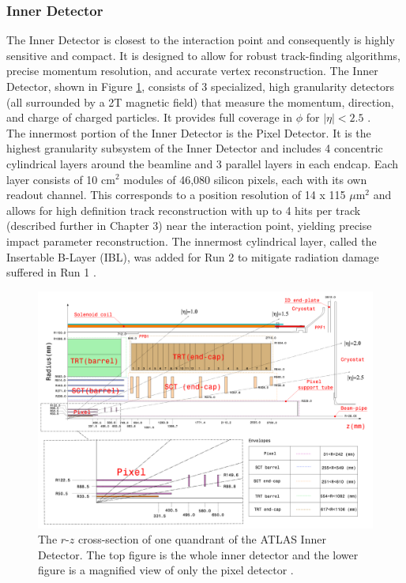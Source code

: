 \subsubsection{Inner Detector}
The Inner Detector is closest to the interaction point and consequently is highly sensitive and compact. It is designed to allow for robust track-finding algorithms, precise momentum resolution, and accurate vertex reconstruction. The Inner Detector, shown in Figure \ref{fig:id}, consists of 3 specialized, high granularity detectors (all surrounded by a 2T magnetic field) that measure the momentum, direction, and charge of charged particles. It provides full coverage in $\phi$ for $|\eta|<2.5$ \cite{inner_detec}.\\

The innermost portion of the Inner Detector is the Pixel Detector. It is the highest granularity subsystem of the Inner Detector and includes 4 concentric cylindrical layers around the beamline and 3 parallel layers in each endcap. Each layer consists of 10 $\text{cm}^2$ modules of 46,080 silicon pixels, each with its own readout channel. This corresponds to a position resolution of 14 x 115 $\mu\text{m}^2$ and allows for high definition track reconstruction with up to 4 hits per track (described further in Chapter 3) near the interaction point, yielding precise impact parameter reconstruction. The innermost cylindrical layer, called the Insertable B-Layer (IBL), was added for Run 2 to mitigate radiation damage suffered in Run 1 \cite{ibl}.\\

\begin{figure}[h]
    \centering
    \includegraphics[width=5in]{figures/chapter2/inner_detec.png}
    \caption{The $r\text{-}z$ cross-section of one quandrant of the ATLAS Inner Detector. The top figure is the whole inner detector and the lower figure is a magnified view of only the pixel detector \cite{inner_detec}.}
    \label{fig:id}
\end{figure}

